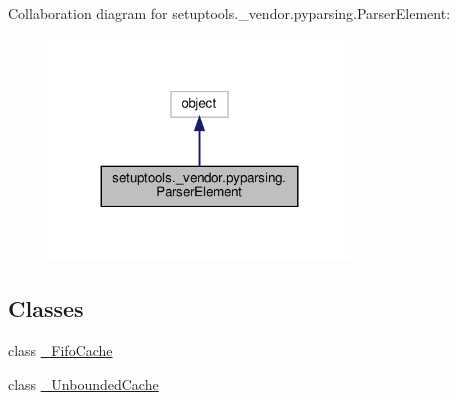 Collaboration diagram for setuptools.\+\_\+vendor.\+pyparsing.\+Parser\+Element\+:
\nopagebreak
\begin{figure}[H]
\begin{center}
\leavevmode
\includegraphics[width=227pt]{classsetuptools_1_1__vendor_1_1pyparsing_1_1ParserElement__coll__graph}
\end{center}
\end{figure}
\subsection*{Classes}
\begin{DoxyCompactItemize}
\item 
class \hyperlink{classsetuptools_1_1__vendor_1_1pyparsing_1_1ParserElement_1_1__FifoCache}{\+\_\+\+Fifo\+Cache}
\item 
class \hyperlink{classsetuptools_1_1__vendor_1_1pyparsing_1_1ParserElement_1_1__UnboundedCache}{\+\_\+\+Unbounded\+Cache}
\end{DoxyCompactItemize}
